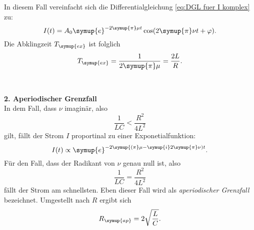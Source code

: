 In diesem Fall vereinfacht sich die Differentialgleichung \eqref{eq:DGL fuer I komplex} zu:
\begin{equation*}
    I(t)=A_{0} \symup{e}^{-2\symup{\pi}\mu t} \cos(2\symup{\pi}\nu t + \varphi).
\end{equation*}
Die Abklingzeit $T_{\symup{ex}}$ ist folglich
\begin{equation}
    T_{\symup{ex}}=\frac{1}{2\symup{\pi}\mu}=\frac{2L}{R}.
    \label{eq:Abklingzeit}
\end{equation}
\\
\\
\textbf{2. Aperiodischer Grenzfall} \\
In dem Fall, dass $\nu$ imaginär, also
\begin{equation*}
    \frac{1}{LC} < \frac{R^{2}}{4L^{2}}
\end{equation*}
gilt, fällt der Strom $I$ proportinal zu einer Exponetialfunktion:
\begin{equation*}
    I(t) \propto \symup{e}^{-2\symup{(\pi}\mu-\symup{i}2\symup{\pi}\nu)t}.
\end{equation*}
Für den Fall, dass der Radikant von $\nu$ genau null ist, also
\begin{equation*}
    \frac{1}{LC} = \frac{R^{2}}{4L^{2}}
\end{equation*}
fällt der Strom am schnellsten. Eben dieser Fall wird als \textit{aperiodischer Grenzfall} bezeichnet. Umgestellt nach $R$ ergibt sich
\begin{equation}
    R_{\symup{ap}} = 2\sqrt{\frac{L}{C}}.
    \label{eq:Widerstand aperiodischer Grenzfall}
\end{equation}

